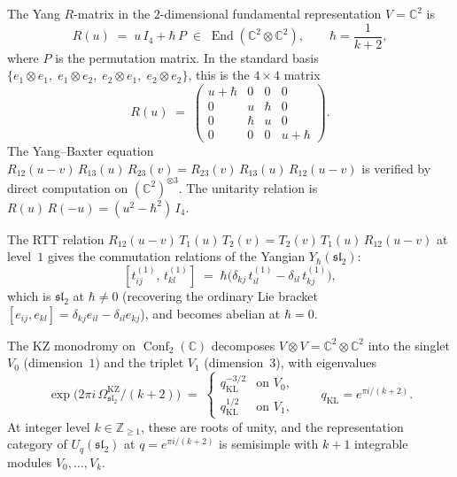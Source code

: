 \documentclass[11pt,reqno]{amsart}
\theoremstyle{definition}
\theoremstyle{remark}
\DeclareMathOperator{\End}{End}
\DeclareMathOperator{\Conf}{Conf}
\newcommand{\CC}{\mathbb{C}}
\newcommand{\ZZ}{\mathbb{Z}}
\numberwithin{equation}{section}
\begin{document}
The Yang $R$-matrix in the $2$-dimensional fundamental
representation $V = \CC^2$ is
\begin{equation}\label{eq:sl2-yang-r}
  R(u)
  \;=\;
  u\, I_4 + \hbar\, P
  \;\in\;
  \End(\CC^2 \otimes \CC^2),
  \qquad
  \hbar = \frac{1}{k + 2},
\end{equation}
where $P$ is the permutation matrix. In the standard basis
$\{e_1 \otimes e_1,\; e_1 \otimes e_2,\;
e_2 \otimes e_1,\; e_2 \otimes e_2\}$, this is the
$4 \times 4$ matrix
\begin{equation}\label{eq:sl2-r-matrix-4x4}
  R(u)
  \;=\;
  \begin{pmatrix}
    u + \hbar & 0 & 0 & 0 \\
    0 & u & \hbar & 0 \\
    0 & \hbar & u & 0 \\
    0 & 0 & 0 & u + \hbar
  \end{pmatrix}.
\end{equation}
The Yang--Baxter equation
$R_{12}(u-v)\, R_{13}(u)\, R_{23}(v)
= R_{23}(v)\, R_{13}(u)\, R_{12}(u-v)$
is verified by direct computation on $(\CC^2)^{\otimes 3}$.
The unitarity relation is $R(u)\, R(-u) = (u^2 - \hbar^2)\, I_4$.

The RTT relation
$R_{12}(u-v)\, T_1(u)\, T_2(v) = T_2(v)\, T_1(u)\, R_{12}(u-v)$
at level~$1$ gives the commutation relations of the Yangian
$Y_\hbar(\mathfrak{sl}_2)$:
\begin{equation}\label{eq:sl2-rtt-relations}
  [t_{ij}^{(1)},\, t_{kl}^{(1)}]
  \;=\;
  \hbar\bigl(\delta_{kj}\, t_{il}^{(1)}
  - \delta_{il}\, t_{kj}^{(1)}\bigr),
\end{equation}
which is $\mathfrak{sl}_2$ at $\hbar \neq 0$ (recovering the
ordinary Lie bracket $[e_{ij}, e_{kl}]
= \delta_{kj} e_{il} - \delta_{il} e_{kj}$), and becomes
abelian at $\hbar = 0$.

The KZ monodromy on $\Conf_2(\CC)$ decomposes $V \otimes V
= \CC^2 \otimes \CC^2$ into the singlet $V_0$ (dimension~$1$)
and the triplet $V_1$ (dimension~$3$), with eigenvalues
\begin{equation}\label{eq:sl2-monodromy-eigenvalues}
  \exp\!\bigl(2\pi i\,\Omega^{\mathrm{KZ}}_{\mathfrak{sl}_2}/(k+2)\bigr)
  \;=\;
  \begin{cases}
    q_{\mathrm{KL}}^{-3/2} & \text{on } V_0, \\[3pt]
    q_{\mathrm{KL}}^{1/2} & \text{on } V_1,
  \end{cases}
  \qquad q_{\mathrm{KL}}=e^{\pi i/(k+2)}.
\end{equation}
At integer level $k \in \ZZ_{\geq 1}$, these are roots of unity,
and the representation category of $U_q(\mathfrak{sl}_2)$
at $q = e^{\pi i/(k+2)}$ is semisimple with $k+1$ integrable
modules $V_0, \ldots, V_k$.
\end{document}
